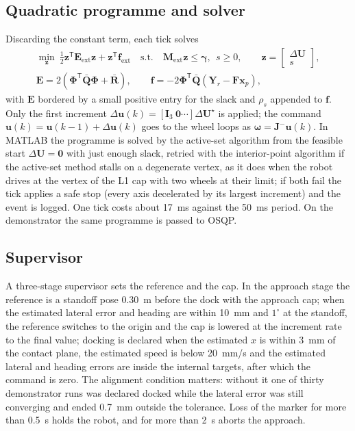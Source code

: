 \documentclass[11pt,a4paper]{article}
\newcommand{\vect}[1]{\bm{#1}}
\newcommand{\mat}[1]{\bm{#1}}
\newcommand{\T}{^{\mathsf{T}}}
\newcommand{\dU}{\Delta\vect{U}}
\newcommand{\du}{\Delta\vect{u}}
\newcommand{\Qbar}{\bar{\mat{Q}}}
\newcommand{\Rbar}{\bar{\mat{R}}}
\begin{document}
\subsection{Quadratic programme and solver}
Discarding the constant term, each tick solves
\begin{gather}
\min_{\vect z}\ \tfrac12\vect z\T\mat E_{\mathrm{ext}}\vect z + \vect z\T\vect f_{\mathrm{ext}}
\quad\text{s.t.}\quad \mat M_{\mathrm{ext}}\vect z\le\vect\gamma,\ \ s\ge 0,\qquad
\vect z = \begin{bmatrix}\dU\\ s\end{bmatrix},
\label{eq:mpc-qp}\\
\mat E = 2(\mat\Phi\T\Qbar\mat\Phi + \Rbar),\qquad
\vect f = -2\mat\Phi\T\Qbar(\vect Y_r - \mat F\vect x_p),
\end{gather}
with $\mat E$ bordered by a small positive entry for the slack and $\rho_s$ appended to $\vect f$. Only the first increment $\du(k) = [\mat I_3\ \mat 0\cdots]\dU^\star$ is applied; the command $\vect u(k) = \vect u(k-1) + \du(k)$ goes to the wheel loops as $\vect\omega = \mat J^{-}\vect u(k)$. In MATLAB the programme is solved by the active-set algorithm from the feasible start $\dU = \vect 0$ with just enough slack, retried with the interior-point algorithm if the active-set method stalls on a degenerate vertex, as it does when the robot drives at the vertex of the L1 cap with two wheels at their limit; if both fail the tick applies a safe stop (every axis decelerated by its largest increment) and the event is logged. One tick costs about 17~ms against the 50~ms period. On the demonstrator the same programme is passed to OSQP.

\subsection{Supervisor}
A three-stage supervisor sets the reference and the cap. In the approach stage the reference is a standoff pose 0.30~m before the dock with the approach cap; when the estimated lateral error and heading are within 10~mm and $1^\circ$ at the standoff, the reference switches to the origin and the cap is lowered at the increment rate to the final value; docking is declared when the estimated $x$ is within 3~mm of the contact plane, the estimated speed is below 20~mm/s and the estimated lateral and heading errors are inside the internal targets, after which the command is zero. The alignment condition matters: without it one of thirty demonstrator runs was declared docked while the lateral error was still converging and ended 0.7~mm outside the tolerance. Loss of the marker for more than 0.5~s holds the robot, and for more than 2~s aborts the approach.
\end{document}
